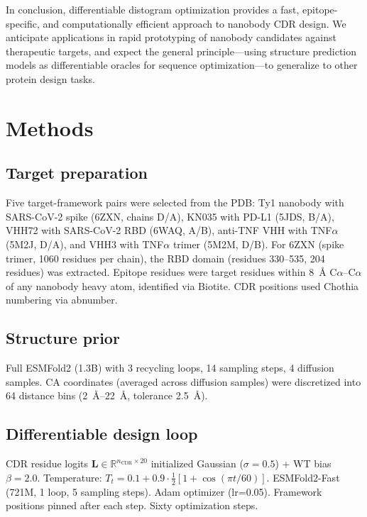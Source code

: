 \documentclass[11pt,a4paper]{article}
\begin{document}
In conclusion, differentiable distogram optimization provides a fast, epitope-specific, and computationally efficient approach to nanobody CDR design. We anticipate applications in rapid prototyping of nanobody candidates against therapeutic targets, and expect the general principle---using structure prediction models as differentiable oracles for sequence optimization---to generalize to other protein design tasks.

\section{Methods}

\subsection{Target preparation}
Five target-framework pairs were selected from the PDB: Ty1 nanobody with SARS-CoV-2 spike (6ZXN, chains D/A), KN035 with PD-L1 (5JDS, B/A), VHH72 with SARS-CoV-2 RBD (6WAQ, A/B), anti-TNF VHH with TNF$\alpha$ (5M2J, D/A), and VHH3 with TNF$\alpha$ trimer (5M2M, D/B). For 6ZXN (spike trimer, \num{1060} residues per chain), the RBD domain (residues 330--535, \num{204} residues) was extracted. Epitope residues were target residues within \SI{8}{\AA} C$\alpha$--C$\alpha$ of any nanobody heavy atom, identified via Biotite\cite{kunzmann2023}. CDR positions used Chothia numbering via abnumber\cite{al1997}.

\subsection{Structure prior}
Full ESMFold2 (1.3B)\cite{lin2023} with 3 recycling loops, 14 sampling steps, 4 diffusion samples. CA coordinates (averaged across diffusion samples) were discretized into 64 distance bins (\SIrange{2}{22}{\AA}, tolerance \SI{2.5}{\AA}).

\subsection{Differentiable design loop}
CDR residue logits $\mathbf{L} \in \mathbb{R}^{n_\text{CDR} \times 20}$ initialized Gaussian ($\sigma=0.5$) + WT bias $\beta=2.0$. Temperature: $T_t = 0.1 + 0.9 \cdot \frac{1}{2}[1 + \cos(\pi t/60)]$. ESMFold2-Fast (721M, 1 loop, 5 sampling steps). Adam optimizer (lr=\num{0.05}). Framework positions pinned after each step. Sixty optimization steps.
\end{document}
